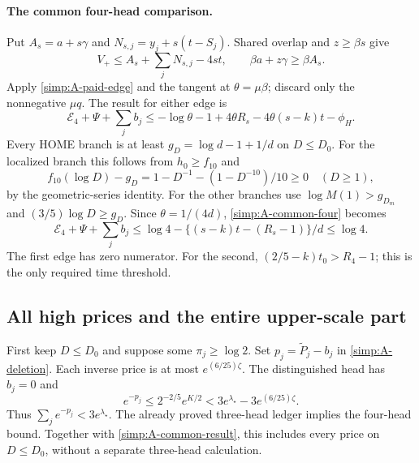 \paragraph{The common four-head comparison.}
Put $A_s=a+s\gamma$ and $N_{s,j}=y_j+s(t-S_j)$.
Shared overlap and $z\ge\beta s$ give
\[
 V_+\le A_s+\sum_jN_{s,j}-4st,
 \qquad \beta a+z\gamma\ge\beta A_s.
\]
Apply \eqref{simp:A-paid-edge} and the tangent at
$\theta=\mu\beta$; discard only the nonnegative $\mu q$.
The result for either edge is
\begin{equation}\label{simp:A-common-four}
 \mathcal E_4+\Psi+\sum_jb_j
 \le-\log\theta-1+4\theta R_s-4\theta(s-k)t-\phi_H.
\end{equation}
Every HOME branch is at least
$g_D=\log d-1+1/d$ on $D\le D_0$.
For the localized branch this follows from $h_0\ge f_{10}$ and
\[
 f_{10}(\log D)-g_D
 =1-D^{-1}-(1-D^{-10})/10\ge0\quad(D\ge1),
\]
by the geometric-series identity.  For the other branches use
$\log M(1)>g_{D_m}$ and $(3/5)\log D\ge g_D$.
Since $\theta=1/(4d)$, \eqref{simp:A-common-four} becomes
\begin{equation}\label{simp:A-common-result}
 \mathcal E_4+\Psi+\sum_jb_j
 \le\log4-\{(s-k)t-(R_s-1)\}/d\le\log4.
\end{equation}
The first edge has zero numerator.  For the second,
$(2/5-k)t_0>R_4-1$; this is the only required time threshold.

\subsection{All high prices and the entire upper-scale part}

First keep $D\le D_0$ and suppose some $\pi_j\ge\log2$.
Set $p_j=\widetilde P_j-b_j$ in \eqref{simp:A-deletion}.
Each inverse price is at most $e^{(6/25)\zeta}$.
The distinguished head has $b_j=0$ and
\[
 e^{-p_j}\le2^{-2/5}e^{K/2}
 <3e^{\lambda_\star}-3e^{(6/25)\zeta}.
\]
Thus $\sum_j e^{-p_j}<3e^{\lambda_\star}$.
The already proved three-head ledger implies the four-head bound.
Together with \eqref{simp:A-common-result}, this includes every price
on $D\le D_0$, without a separate three-head calculation.

